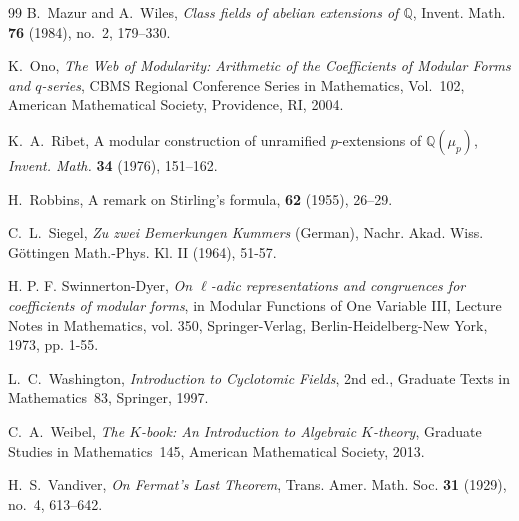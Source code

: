 \documentclass[12pt]{amsart}
\theoremstyle{plain}
\theoremstyle{definition}
\newcommand{\QQ}{\mathbb{Q}}
\begin{document}
\begin{thebibliography}{99}
B.~Mazur and A.~Wiles,
\textit{Class fields of abelian extensions of $\mathbb{Q}$},
Invent. Math. \textbf{76} (1984), no.~2, 179--330.

K.~Ono,
\emph{The Web of Modularity: Arithmetic of the Coefficients of Modular Forms and $q$-series},
CBMS Regional Conference Series in Mathematics, Vol.~102,
American Mathematical Society, Providence, RI, 2004.

K.~A.~Ribet,
A modular construction of unramified $p$-extensions of $\QQ(\mu_p)$,
\emph{Invent. Math.} \textbf{34} (1976), 151--162.

H.~Robbins,
\newblock A remark on Stirling's formula,
 {\bf 62} (1955), 26--29.

C.~L.~Siegel, \emph{Zu zwei Bemerkungen Kummers} (German),
Nachr. Akad. Wiss. G\"ottingen Math.-Phys. Kl. II  (1964), 51-57.

 H. P. F. Swinnerton-Dyer, \emph{On $\ell$-adic representations and congruences for coefficients of modular forms},  in Modular Functions of One Variable III, Lecture Notes in Mathematics, vol. 350, Springer-Verlag, Berlin-Heidelberg-New York, 1973, pp. 1-55.

L.~C.~Washington,
\emph{Introduction to Cyclotomic Fields},
2nd ed., Graduate Texts in Mathematics~83, Springer, 1997.


C.~A.~Weibel,
\emph{The $K$-book: An Introduction to Algebraic $K$-theory},
Graduate Studies in Mathematics~145, American Mathematical Society, 2013.

H.~S.~Vandiver,
\textit{On Fermat's Last Theorem},
Trans. Amer. Math. Soc. \textbf{31} (1929), no.~4, 613--642.

\end{thebibliography}
\end{document}
